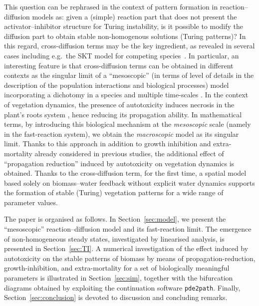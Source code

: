 \documentclass[11pt]{elsarticle}
\theoremstyle{plain}
\theoremstyle{definition}
\theoremstyle{myremark}
\begin{document}
\vspace{.2cm}

This question can be rephrased in the context of pattern formation in reaction--diffusion models as: given a (simple) reaction part that does not present the activator--inhibitor structure for Turing instability, is it possible to modify the diffusion part to obtain stable non-homogenous solutions (Turing patterns)? In this regard, cross-diffusion terms may be the key ingredient, as revealed in several cases including e.g.~the SKT model for competing species~\cite{Fanelli_2013, Ritchie_2022, shigesada1979spatial, villar2024}. In particular, an interesting feature is that cross-diffusion terms can be obtained in different contexts as the singular limit of a ``mesoscopic'' (in terms of level of details in the description of the population interactions and biological processes) model incorporating a dichotomy in a species and multiple time-scales \cite{desvillettes2018, eliavs2021singular, eliavs2022aggregation, iida2006diffusion}. In the context of vegetation dynamics, the presence of autotoxicity induces necrosis in the plant's roots system \cite{Bonanomi_2022, Mazzoleni_2014}, hence reducing its propagation ability. In mathematical terms, by introducing this biological mechanism at the \textit{mesoscopic} scale (namely in the fast-reaction system), we obtain the \textit{macroscopic} model as its singular limit. Thanks to this approach in addition to growth inhibition and extra-mortality already considered in previous studies, the additional effect of ``propagation reduction'' induced by autotoxicity on vegetation dynamics is obtained. Thanks to the cross-diffusion term, for the first time, a spatial model based solely on biomass--water feedback without explicit water dynamics supports the formation of stable (Turing) vegetation patterns for a wide range of parameter values.
\vspace{.2cm}

The paper is organised as follows. In Section~\ref{sec:model}, we present the ``mesoscopic'' reaction--diffusion model and its fast-reaction limit. The emergence of non-homogeneous steady states, investigated by linearised analysis, is presented in Section~\ref{sec:TI}. A numerical investigation of the effect induced by autotoxicity on the stable patterns of biomass by means of propagation-reduction, growth-inhibition, and extra-mortality for a set of biologically meaningful parameters is illustrated in Section~\ref{sec:sim}, together with the bifurcation diagrams obtained by exploiting the continuation software \texttt{pde2path}. Finally, Section~\ref{sec:conclusion} is devoted to discussion and concluding remarks.
\end{document}
